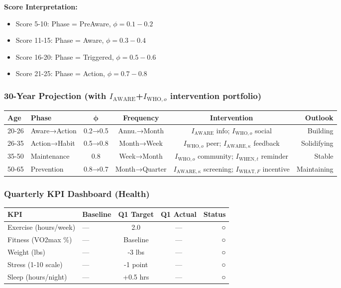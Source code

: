 \textbf{Score Interpretation:}
\begin{itemize}[nosep]
\item Score 5-10: Phase = PreAware, $\phi = 0.1-0.2$
\item Score 11-15: Phase = Aware, $\phi = 0.3-0.4$
\item Score 16-20: Phase = Triggered, $\phi = 0.5-0.6$
\item Score 21-25: Phase = Action, $\phi = 0.7-0.8$
\end{itemize}

\subsubsection{30-Year Projection (with $I_{\text{AWARE}}$+$I_{\text{WHO},o}$ intervention portfolio)}

\begin{center}
\small
\begin{tabular}{@{}llcccr@{}}
\toprule
\textbf{Age} & \textbf{Phase} & $\boldsymbol{\phi}$ & \textbf{Frequency} & \textbf{Intervention} & \textbf{Outlook} \\
\midrule
20-26 & Aware→Action & 0.2→0.5 & Annu.→Month & $I_{\text{AWARE}}$ info; $I_{\text{WHO},o}$ social & Building \\
26-35 & Action→Habit & 0.5→0.8 & Month→Week & $I_{\text{WHO},o}$ peer; $I_{\text{AWARE},\kappa}$ feedback & Solidifying \\
35-50 & Maintenance & 0.8 & Week→Month & $I_{\text{WHO},o}$ community; $I_{\text{WHEN},t}$ reminder & Stable \\
50-65 & Prevention & 0.8→0.7 & Month→Quarter & $I_{\text{AWARE},\kappa}$ screening; $I_{\text{WHAT},F}$ incentive & Maintaining \\
\midrule
\end{tabular}
\end{center}

\subsubsection{Quarterly KPI Dashboard (Health)}

\begin{center}
\small
\begin{tabular}{@{}llccr@{}}
\toprule
\textbf{KPI} & \textbf{Baseline} & \textbf{Q1 Target} & \textbf{Q1 Actual} & \textbf{Status} \\
\midrule
Exercise (hours/week) & — & 2.0 & — & ○ \\
Fitness (VO2max \%) & — & Baseline & — & ○ \\
Weight (lbs) & — & -3 lbs & — & ○ \\
Stress (1-10 scale) & — & -1 point & — & ○ \\
Sleep (hours/night) & — & +0.5 hrs & — & ○ \\
\midrule
\end{tabular}
\end{center}

